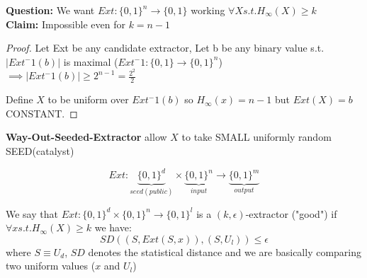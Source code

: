 \textbf{Question: }We want $Ext:\{0,1\}^n \to \{0,1\}$ working $\forall X s.t. H_{\infty}(X)\geq k$\\
\textbf{Claim: } Impossible even for $k=n-1$
\begin{proof}
    Let Ext be any candidate extractor, Let b be any binary value s.t. $|Ext^-1(b)|$ is maximal ($Ext^-1: \{0,1\} \to \{0,1\}^n$)\\
    $\implies |Ext^-1(b)|\geq 2^{n-1}=\frac{2^2}{2}$

    \begin{figure}[ht]
        \centering
    \end{figure}

    Define $X$ to be uniform over $Ext^-1(b)$ so $H_{\infty}(x)=n-1$ but $Ext(X)=b$ CONSTANT.
\end{proof}

\begin{theorem}
    \textbf{Way-Out-Seeded-Extractor} allow $X$ to take SMALL uniformly random SEED(catalyst)

    $$Ext: \underbrace{\{0,1\}^d}_{seed(public)}\times \underbrace{\{0,1\}^n}_{input} \to \underbrace{\{0,1\}^m}_{output}$$
\end{theorem}
\begin{definition}
    We say that $Ext:\{0,1\}^d \times \{0,1\}^n \to \{0,1\}^l$ is a $(k,\epsilon)$-extractor ("good") if $\forall x s.t. H_{\infty}(X)\geq k$ we have:
    $$SD((S,Ext(S,x)),(S,U_l))\leq \epsilon$$ 
    where $S\equiv U_d$, $SD$ denotes the statistical distance and we are basically comparing two uniform values ($x$ and $U_l$) 
\end{definition}

